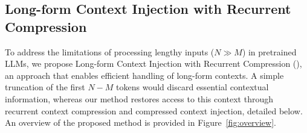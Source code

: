 




\subsection{Long-form Context Injection with Recurrent Compression}
To address the limitations of processing lengthy inputs ($N \gg M$) in pretrained LLMs, we propose Long-form Context Injection with Recurrent Compression (\model{}), an approach that enables efficient handling of long-form contexts. A simple truncation of the first $N-M$ tokens would discard essential contextual information, whereas our method restores access to this context through recurrent context compression and compressed context injection, detailed below. An overview of the proposed method is provided in Figure~\ref{fig:overview}.

